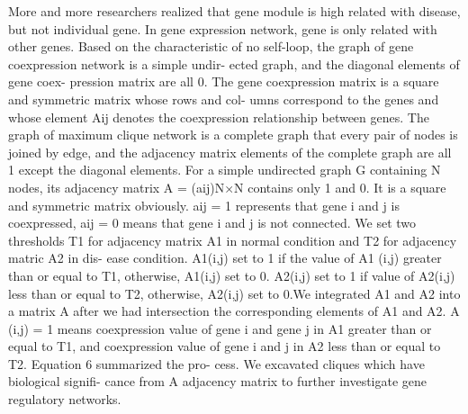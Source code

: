 More and more researchers realized that gene module is high related with disease, but not individual gene. In gene expression network, gene is only related with other genes. Based on the characteristic of no self-loop, the graph of gene coexpression network is a simple undir- ected graph, and the diagonal elements of gene coex- pression matrix are all 0. The gene coexpression matrix is a square and symmetric matrix whose rows and col- umns correspond to the genes and whose element Aij denotes the coexpression relationship between genes. The graph of maximum clique network is a complete graph that every pair of nodes is joined by edge, and the adjacency matrix elements of the complete graph are all 1 except the diagonal elements. For a simple undirected graph G containing N nodes, its adjacency matrix A = (aij)N×N contains only 1 and 0. It is a square and symmetric matrix obviously. aij = 1 represents that gene i and j is coexpressed, aij = 0 means that gene i and j is not connected.
We set two thresholds T1 for adjacency matrix A1 in normal condition and T2 for adjacency matric A2 in dis- ease condition. A1(i,j) set to 1 if the value of A1 (i,j) greater than or equal to T1, otherwise, A1(i,j) set to 0. A2(i,j) set to 1 if value of A2(i,j) less than or equal to T2, otherwise, A2(i,j) set to 0.We integrated A1 and A2 into a matrix A after we had intersection the corresponding elements of A1 and A2. A (i,j) = 1 means coexpression value of gene i and gene j in A1 greater than or equal to T1, and coexpression value of gene i and j in A2 less than or equal to T2. Equation 6 summarized the pro- cess. We excavated cliques which have biological signifi- cance from A adjacency matrix to further investigate gene regulatory networks.
 

